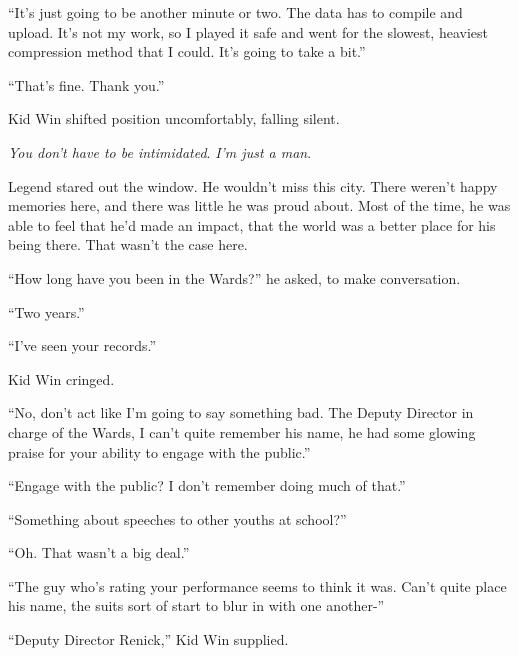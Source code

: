 





``It's just going to be another minute or two.  The data has to compile and upload.  It's not my work, so I played it safe and went for the slowest, heaviest compression method that I could.  It's going to take a bit.''



``That's fine.  Thank you.''



Kid Win shifted position uncomfortably, falling silent.



\emph{You don't have to be intimidated}.  \emph{I'm just a man}.



Legend stared out the window.  He wouldn't miss this city.  There weren't happy memories here, and there was little he was proud about.  Most of the time, he was able to feel that he'd made an impact, that the world was a better place for his being there.  That wasn't the case here.



``How long have you been in the Wards?'' he asked, to make conversation.



``Two years.''



``I've seen your records.''



Kid Win cringed.



``No, don't act like I'm going to say something bad.  The Deputy Director in charge of the Wards, I can't quite remember his name, he had some glowing praise for your ability to engage with the public.''



``Engage with the public?  I don't remember doing much of that.''



``Something about speeches to other youths at school?''



``Oh.  That wasn't a big deal.''



``The guy who's rating your performance seems to think it was.  Can't quite place his name, the suits sort of start to blur in with one another-''



``Deputy Director Renick,'' Kid Win supplied.



